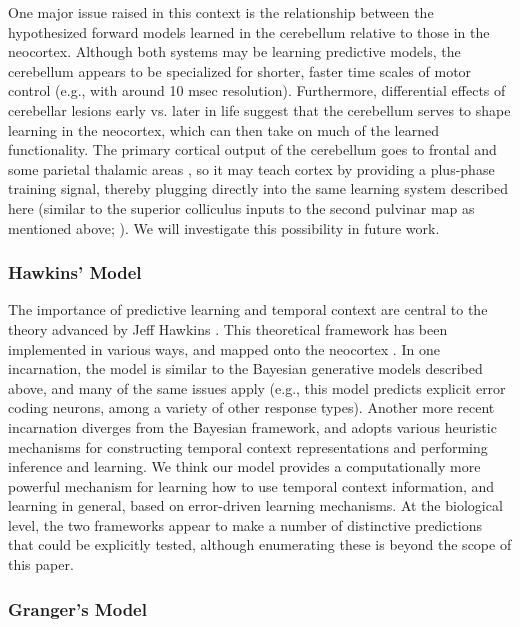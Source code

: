 \documentclass[11pt,twoside]{article}
\newif\myifpdf
\begin{document}
One major issue raised in this context is the relationship between the hypothesized forward models learned in the cerebellum \cite{WolpertMiallKawato98,Verduzco-FloresOReilly15,Shadmehr17} relative to those in the neocortex.  Although both systems may be learning predictive models, the cerebellum appears to be specialized for shorter, faster time scales of motor control (e.g., with around 10 msec resolution).  Furthermore, differential effects of cerebellar lesions early vs. later in life suggest that the cerebellum serves to shape learning in the neocortex, which can then take on much of the learned functionality.  The primary cortical output of the cerebellum goes to frontal and some parietal thalamic areas \cite{StrickDumFiez09}, so it may teach cortex by providing a plus-phase training signal, thereby plugging directly into the same learning system described here (similar to the superior colliculus inputs to the second pulvinar map as mentioned above; ).  We will investigate this possibility in future work.

\subsubsection{Hawkins' Model}

The importance of predictive learning and temporal context are central to the theory advanced by Jeff Hawkins \cite{HawkinsBlakeslee04}.  This theoretical framework has been implemented in various ways, and mapped onto the neocortex \cite{GeorgeHawkins09}.  In one incarnation, the model is similar to the Bayesian generative models described above, and many of the same issues apply (e.g., this model predicts explicit error coding neurons, among a variety of other response types).  Another more recent incarnation diverges from the Bayesian framework, and adopts various heuristic mechanisms for constructing temporal context representations and performing inference and learning.  We think our model provides a computationally more powerful mechanism for learning how to use temporal context information, and learning in general, based on error-driven learning mechanisms.  At the biological level, the two frameworks appear to make a number of distinctive predictions that could be explicitly tested, although enumerating these is beyond the scope of this paper.

\subsubsection{Granger's Model}
\end{document}
